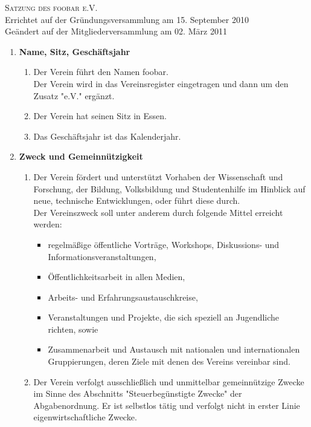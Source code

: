 

\pagestyle{empty}

\textsc{\huge Satzung des foobar e.V.}\\[0.5cm]
Errichtet auf der Gründungsversammlung am 15. September 2010\\ Geändert auf der Mitgliederversammlung am 02. März 2011
\begin{enumerate}[label=\bfseries §\arabic*]
  \item \textbf{Name, Sitz, Geschäftsjahr}
    \begin{enumerate}[label=\bfseries (\arabic*)] 
      \item Der Verein führt den Namen foobar.\\ Der Verein wird in das Vereinsregister eingetragen und dann um den Zusatz "e.V." ergänzt.
      \item Der Verein hat seinen Sitz in Essen.
      \item Das Geschäftsjahr ist das Kalenderjahr.
    \end{enumerate}
  \item \textbf{Zweck und Gemeinnützigkeit}
    \begin{enumerate}[label=\bfseries (\arabic*)]
      \item Der Verein fördert und unterstützt Vorhaben der Wissenschaft und Forschung, der Bildung, Volksbildung und Studentenhilfe im Hinblick auf neue, technische Entwicklungen, oder führt diese durch.\\ Der Vereinszweck soll unter anderem durch folgende Mittel erreicht werden:
      \begin{itemize}
        \item regelmäßige öffentliche Vorträge, Workshops, Diskussions- und Informationsveranstaltungen,
        \item Öffentlichkeitsarbeit in allen Medien,
        \item Arbeits- und Erfahrungsaustauschkreise,
        \item Veranstaltungen und Projekte, die sich speziell an Jugendliche richten, sowie
        \item Zusammenarbeit und Austausch mit nationalen und internationalen Gruppierungen, deren Ziele mit denen des Vereins vereinbar sind.
      \end{itemize}
      \item Der Verein verfolgt ausschließlich und unmittelbar gemeinnützige Zwecke im Sinne des Abschnitts "Steuerbegünstigte Zwecke" der Abgabenordnung. Er ist selbstlos tätig und verfolgt nicht in erster Linie eigenwirtschaftliche Zwecke.\\

\end{enumerate}
\end{enumerate}
